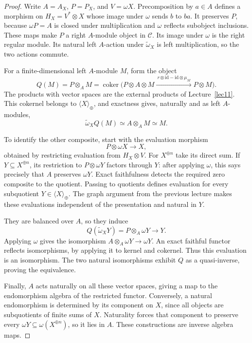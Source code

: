 \begin{proof}
Write $A=A_X$, $P=P_X$, and $V=\omega X$. Precomposition by $a\in A$ defines a morphism on $H_X=V^*\otimes X$ whose image under $\omega$ sends $b$ to $ba$. It preserves $P$, because $\omega P=A$ is closed under multiplication and $\omega$ reflects subobject inclusions. These maps make $P$ a right $A$-module object in $\mathcal C$. Its image under $\omega$ is the right regular module. Its natural left $A$-action under $\widetilde\omega_X$ is left multiplication, so the two actions commute.

For a finite-dimensional left $A$-module $M$, form the object
\[
 Q(M)=P\otimes_A M
 =\operatorname{coker}\bigl(P\otimes A\otimes M
 \xrightarrow{\ r\otimes\mathrm{id}-\mathrm{id}\otimes\mu_M\ }
 P\otimes M\bigr).
\]
The products with vector spaces are the external products of Lecture~\ref{lec11}. This cokernel belongs to $\langle X\rangle_{\oplus}$, and exactness gives, naturally and as left $A$-modules,
\[
 \widetilde\omega_XQ(M)\simeq A\otimes_A M\simeq M.
\]

To identify the other composite, start with the evaluation morphism
\[
 P\otimes\omega X\longrightarrow X,
\]
obtained by restricting evaluation from $H_X\otimes V$. For $X^{\oplus n}$ take its direct sum. If $Y\subseteq X^{\oplus n}$, its restriction to $P\otimes\omega Y$ factors through $Y$: after applying $\omega$, this says precisely that $A$ preserves $\omega Y$. Exact faithfulness detects the required zero composite to the quotient. Passing to quotients defines evaluation for every subquotient $Y\in\langle X\rangle_{\oplus}$. The graph argument from the previous lecture makes these evaluations independent of the presentation and natural in $Y$.

They are balanced over $A$, so they induce
\[
 Q(\widetilde\omega_XY)=P\otimes_A\omega Y\longrightarrow Y.
\]
Applying $\omega$ gives the isomorphism $A\otimes_A\omega Y\to\omega Y$. An exact faithful functor reflects isomorphisms, by applying it to kernel and cokernel. Thus this evaluation is an isomorphism. The two natural isomorphisms exhibit $Q$ as a quasi-inverse, proving the equivalence.

Finally, $A$ acts naturally on all these vector spaces, giving a map to the endomorphism algebra of the restricted functor. Conversely, a natural endomorphism is determined by its component on $X$, since all objects are subquotients of finite sums of $X$. Naturality forces that component to preserve every $\omega Y\subseteq\omega(X^{\oplus n})$, so it lies in $A$. These constructions are inverse algebra maps.
\end{proof}


